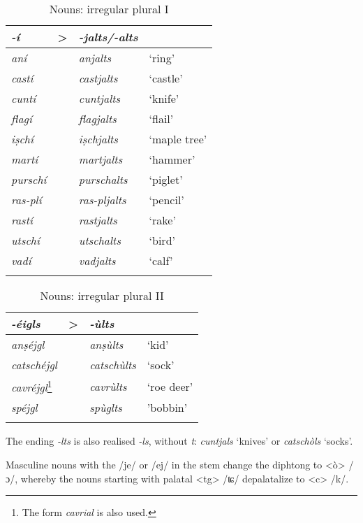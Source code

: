 \begin{table}
\caption{Nouns: irregular plural I}
\label{irregplI}
 \begin{tabular}{llll}
  \lsptoprule
   \textit{-í} & > & \textit{-jalts/-alts}  \\
  \midrule
\textit{aní} && \textit{anjalts} & `ring'\\
\textit{castí} && \textit{castjalts} & `castle' \\
\textit{cuntí} && \textit{cuntjalts} & `knife' \\
\textit{flagí}  &&   \textit{flagjalts} & `flail' \\
\textit{iṣchí} && \textit{iṣchjalts} & `maple tree'\\
\textit{martí} && \textit{martjalts} &`hammer'\\
\textit{purschí} && \textit{purschalts} & `piglet'\\
\textit{ras-plí} && \textit{ras-pljalts} & `pencil'\\
\textit{rastí} && \textit{rastjalts} & `rake'\\
\textit{utschí} && \textit{utschalts}  &`bird'\\
\textit{vadí} && \textit{vadjalts} & `calf'\\
  \lspbottomrule
 \end{tabular}
\end{table}

\begin{table}
\caption{Nouns: irregular plural II}
\label{irregplII}
 \begin{tabular}{llll}
  \lsptoprule
    \textit{-éigls} & > & \textit{-ùlts}\\
  \midrule
\textit{anṣéjgl} && \textit{anṣùlts} & `kid'\\
\textit{catschéjgl} && \textit{catschùlts} & `sock'\\
\textit{cavréjgl}\footnote{The form \textit{cavrial} is also used.} && \textit{cavrùlts} & `roe deer'\\
\textit{spéjgl} && \textit{spùglts} & 'bobbin'\\
 \lspbottomrule
 \end{tabular}
\end{table}

The ending \textit{-lts } is also realised \textit{-ls}, without \textit{t}: \textit{cuntjals} `knives' or \textit{catschòls} `socks'.

Masculine nouns with the  /je/ or /ej/ in the stem change the diphtong to <ò> /ɔ/, whereby the nouns starting with palatal <tg> /ʨ/ depalatalize to <c> /k/.


